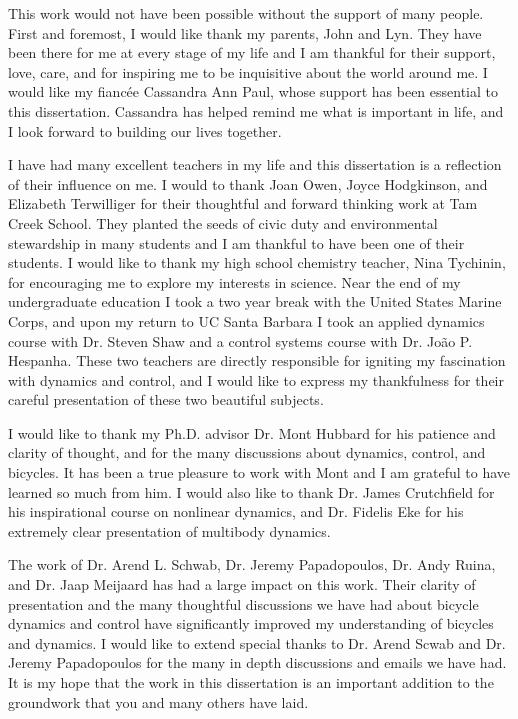 This work would not have been possible without the support of many people.
First and foremost, I would like thank my parents, John and Lyn. They have been
there for me at every stage of my life and I am thankful for their support,
love, care, and for inspiring me to be inquisitive about the world around me.
I would like my fiancée Cassandra Ann Paul, whose support has been essential to
this dissertation. Cassandra has helped remind me what is important in life,
and I look forward to building our lives together.

I have had many excellent teachers in my life and this dissertation is a
reflection of their influence on me. I would to thank Joan Owen, Joyce
Hodgkinson, and Elizabeth Terwilliger for their thoughtful and forward thinking
work at Tam Creek School. They planted the seeds of civic duty and
environmental stewardship in many students and I am thankful to have been one
of their students. I would like to thank my high school chemistry teacher, Nina
Tychinin, for encouraging me to explore my interests in science. Near the end
of my undergraduate education I took a two year break with the United States
Marine Corps, and upon my return to UC Santa Barbara I took an applied dynamics
course with Dr. Steven Shaw and a control systems course with Dr. João P.
Hespanha. These two teachers are directly responsible for igniting my
fascination with dynamics and control, and I would like to express my
thankfulness for their careful presentation of these two beautiful subjects.

I would like to thank my Ph.D. advisor Dr. Mont Hubbard for his patience and
clarity of thought, and for the many discussions about dynamics, control, and
bicycles. It has been a true pleasure to work with Mont and I am grateful to
have learned so much from him. I would also like to thank Dr. James Crutchfield
for his inspirational course on nonlinear dynamics, and Dr. Fidelis Eke for his
extremely clear presentation of multibody dynamics.

The work of Dr. Arend L. Schwab, Dr. Jeremy Papadopoulos, Dr. Andy Ruina, and
Dr. Jaap Meijaard has had a large impact on this work. Their clarity of
presentation and the many thoughtful discussions we have had about bicycle
dynamics and control have significantly improved my understanding of bicycles
and dynamics. I would like to extend special thanks to Dr. Arend Scwab and Dr.
Jeremy Papadopoulos for the many in depth discussions and emails we have had.
It is my hope that the work in this dissertation is an important addition to
the groundwork that you and many others have laid.

